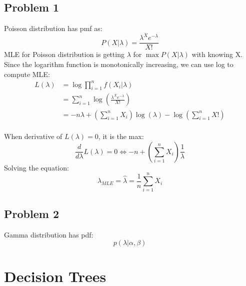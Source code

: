 \documentclass{article}
\begin{document}
\subsection{Problem 1}
Poisson distribution has pmf as: \\
\begin{displaymath}
P(X|\lambda)=\frac{{\lambda^X}{e^{-\lambda}}}{X!}
\end{displaymath}
MLE for Poisson distribution is getting $\lambda$ for $\max P(X|\lambda)$ with knowing X.\\
Since the logarithm function is monotonically increasing, we can use log to compute MLE:\\
\begin{align*}
L(\lambda)&=\log{\prod_{i=1}^n}f(X_i|\lambda)\\
			&=\sum_{i=1}^n \log(\frac{\lambda^X e^{-\lambda}}{X!})\\
			&=-n\lambda + (\sum_{i=1}^n X_i)\log(\lambda)-\log(\sum_{i=1}^n X!)
\end{align*}\\

When derivative of $L(\lambda)=0$, it is the max:\\
\begin{displaymath}	
\frac{d}{d\lambda}L(\lambda)=0 \Leftrightarrow -n+(\sum_{i=1}^n X_i)\frac{1}{\lambda}
\end{displaymath}
Solving the equation:\\
\begin{displaymath}
\lambda_{MLE}=\hat{\lambda}=\frac{1}{n}\sum_{i=1}^n X_i
\end{displaymath}



 



\subsection{Problem 2}
Gamma distribution has pdf:\\
\begin{displaymath}
p(\lambda|\alpha,\beta)
\end{displaymath}




\section{Decision Trees}
\end{document}
